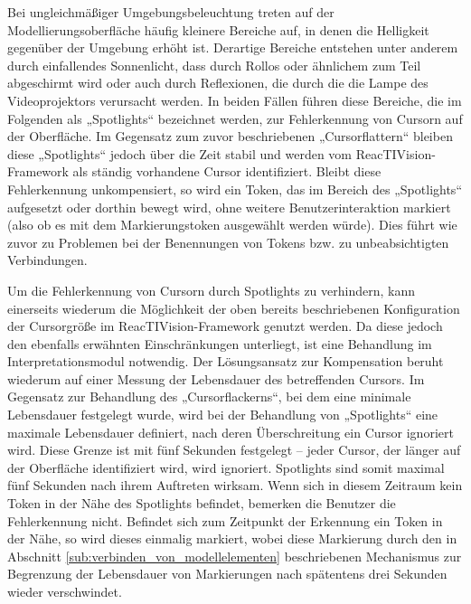 Bei ungleichmäßiger Umgebungsbeleuchtung treten auf der Modellierungsoberfläche häufig kleinere Bereiche auf, in denen die Helligkeit gegenüber der Umgebung erhöht ist. Derartige Bereiche entstehen unter anderem durch einfallendes Sonnenlicht, dass durch Rollos oder ähnlichem zum Teil abgeschirmt wird oder auch durch Reflexionen, die durch die die Lampe des Videoprojektors verursacht werden. In beiden Fällen führen diese Bereiche, die im Folgenden als „Spotlights“ bezeichnet werden, zur Fehlerkennung von Cursorn auf der Oberfläche. Im Gegensatz zum zuvor beschriebenen „Cursorflattern“ bleiben diese „Spotlights“ jedoch über die Zeit stabil und werden vom ReacTIVision-Framework als ständig vorhandene Cursor identifiziert. Bleibt diese Fehlerkennung unkompensiert, so wird ein Token, das im Bereich des „Spotlights“ aufgesetzt oder dorthin bewegt wird, ohne weitere Benutzerinteraktion markiert (also ob es mit dem Markierungstoken ausgewählt werden würde). Dies führt wie zuvor zu Problemen bei der Benennungen von Tokens bzw. zu unbeabsichtigten Verbindungen. 

Um die Fehlerkennung von Cursorn durch Spotlights zu verhindern, kann einerseits wiederum die Möglichkeit der oben bereits beschriebenen Konfiguration der Cursorgröße im ReacTIVision-Framework genutzt werden. Da diese jedoch den ebenfalls erwähnten Einschränkungen unterliegt, ist eine Behandlung im Interpretationsmodul notwendig. Der Lösungsansatz zur Kompensation beruht wiederum auf einer Messung der Lebensdauer des betreffenden Cursors. Im Gegensatz zur Behandlung des „Cursorflackerns“, bei dem eine minimale Lebensdauer festgelegt wurde, wird bei der Behandlung von „Spotlights“ eine maximale Lebensdauer definiert, nach deren Überschreitung ein Cursor ignoriert wird. Diese Grenze ist mit fünf Sekunden festgelegt -- jeder Cursor, der länger auf der Oberfläche identifiziert wird, wird ignoriert. Spotlights sind somit maximal fünf Sekunden nach ihrem Auftreten wirksam. Wenn sich in diesem Zeitraum kein Token in der Nähe des Spotlights befindet, bemerken die Benutzer die Fehlerkennung nicht. Befindet sich zum Zeitpunkt der Erkennung ein Token in der Nähe, so wird dieses einmalig markiert, wobei diese Markierung durch den in Abschnitt \ref{sub:verbinden_von_modellelementen} beschriebenen Mechanismus zur Begrenzung der Lebensdauer von Markierungen nach spätentens drei Sekunden wieder verschwindet.

